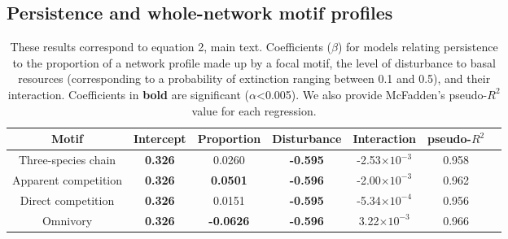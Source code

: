 \documentclass[12pt]{article}
\begin{document}
\begin{spacing}{2.0}



    \subsection{Persistence and whole-network motif profiles}


    \begin{table}[ht!]
        \caption{These results correspond to equation 2, main text. Coefficients ($\beta$) for models relating persistence to the proportion of a network profile made up by a focal motif, the level of disturbance to basal resources (corresponding to a probability of extinction ranging between 0.1 and 0.5), and their interaction. Coefficients in \textbf{bold} are significant ($\alpha$\textless0.005). We also provide McFadden's pseudo-$R^2$ value for each regression. }
        \label{motif_profile_tab}
        \centering
        \footnotesize
        \begin{tabular}{c|c c c c c | c }
        Motif & Intercept & Proportion & Disturbance & Interaction &  pseudo-$R^2$ \\
            \hline
            Three-species chain & \textbf{0.326} &  0.0260 & \textbf{-0.595} & -2.53$\times10^{-3}$ & 0.958 \\
            Apparent competition & \textbf{0.326} & \textbf{0.0501} & \textbf{-0.596} & -2.00$\times10^{-3}$ & 0.962 \\
            Direct competition & \textbf{0.326} & 0.0151 & \textbf{-0.595} & -5.34$\times10^{-4}$ & 0.956 \\
            Omnivory & \textbf{0.326} & \textbf{-0.0626} & \textbf{-0.596} & 3.22$\times10^{-3}$ & 0.966 \\
        \end{tabular}
    \end{table}



\end{spacing}
\end{document}
